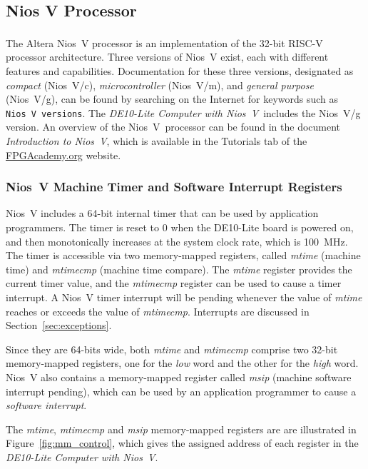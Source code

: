 \documentclass[11pt, twoside, pdftex]{article}
\newcommand{\DEBoard}{DE10-Lite}
\newcommand{\systemNameFull}{DE10-Lite Computer with Nios~V}
\newcommand{\processor}{Nios~V}
\begin{document}
\subsection{Nios\textsuperscript{\textregistered} V Processor}
\label{sec:niosV}
The Altera Nios\textsuperscript{\textregistered}~V processor 
is an implementation of the 32-bit RISC-V processor architecture. Three versions of 
Nios~V exist, each with different features and capabilities.  Documentation for these 
three versions, designated as {\it compact} (Nios~V/c), {\it microcontroller} (Nios~V/m),
and {\it general purpose} (Nios~V/g), can be found by searching on the Internet for keywords 
such as \texttt{Nios~V versions}. The {\it \systemNameFull}~includes 
the Nios~V/g version. An overview of the \processor~processor can be found in the 
document {\it Introduction to \processor}, which is available in the 
Tutorials tab of the 
{\small \href{https://www.fpgacademy.org/tutorials.html} {FPGAcademy.org}} website.

\subsubsection{Nios~V Machine Timer and Software Interrupt Registers}
\label{sec:mtimer}
Nios~V includes a 64-bit internal timer that can be used by application programmers. 
The timer is reset to 0 when the {\DEBoard} board is powered on, and then monotonically
increases at the system clock rate, which is 100~MHz. The timer is accessible via two 
memory-mapped registers, 
called {\it mtime} (machine time) and {\it mtimecmp} (machine time compare). The 
{\it mtime} register provides the current timer value, and the {\it mtimecmp} register 
can be used to cause a timer interrupt. A Nios~V timer interrupt will be pending whenever 
the value of {\it mtime} reaches or exceeds the value of {\it mtimecmp}. Interrupts are 
discussed in Section~\ref{sec:exceptions}.

Since they are 64-bits wide, both {\it mtime} and {\it mtimecmp} comprise two 32-bit 
memory-mapped registers, one for the {\it low} word and the other for the {\it high} word. 
Nios~V also contains a memory-mapped register called {\it msip} (machine software interrupt
pending), which can be used by an application programmer to cause a {\it software interrupt}.

The {\it mtime}, {\it mtimecmp} and {\it msip} memory-mapped registers are 
are illustrated in Figure~\ref{fig:mm_control}, which gives the assigned address of each 
register in the {\it \systemNameFull}.
\end{document}
